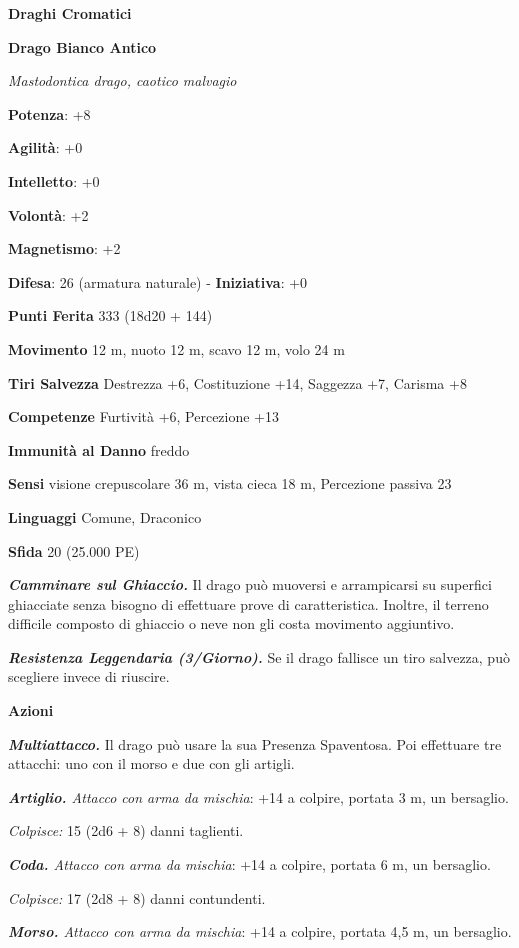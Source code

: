 \begin{multicols}{2}
\textbf{Draghi Cromatici}

\textbf{Drago Bianco Antico}

\emph{Mastodontica drago, caotico malvagio}

\textbf{Potenza}: +8

\textbf{Agilità}: +0

\textbf{Intelletto}: +0

\textbf{Volontà}: +2

\textbf{Magnetismo}: +2

\textbf{Difesa}: 26 (armatura naturale) - \textbf{Iniziativa}: +0

\textbf{Punti Ferita} 333 (18d20 + 144)

\textbf{Movimento} 12 m, nuoto 12 m, scavo 12 m, volo 24 m

\textbf{Tiri Salvezza} Destrezza +6, Costituzione +14, Saggezza +7,
Carisma +8

\textbf{Competenze} Furtività +6, Percezione +13

\textbf{Immunità al Danno} freddo

\textbf{Sensi} visione crepuscolare 36 m, vista cieca 18 m, Percezione passiva
23

\textbf{Linguaggi} Comune, Draconico

\textbf{Sfida} 20 (25.000 PE)\smallskip

\emph{\textbf{Camminare sul Ghiaccio.}} Il drago può muoversi e
arrampicarsi su superfici ghiacciate senza bisogno di effettuare prove
di caratteristica. Inoltre, il terreno difficile composto di ghiaccio o
neve non gli costa movimento aggiuntivo.

\emph{\textbf{Resistenza Leggendaria (3/Giorno).}} Se il drago fallisce
un tiro salvezza, può scegliere invece di riuscire.

\smallskip\textbf{Azioni}

\emph{\textbf{Multiattacco.}} Il drago può usare la sua Presenza
Spaventosa. Poi effettuare tre attacchi: uno con il morso e due con gli
artigli.

\emph{\textbf{Artiglio.} Attacco con arma da mischia}: +14 a colpire,
portata 3 m, un bersaglio.

\emph{Colpisce:} 15 (2d6 + 8) danni taglienti.

\emph{\textbf{Coda.} Attacco con arma da mischia}: +14 a colpire,
portata 6 m, un bersaglio.

\emph{Colpisce:} 17 (2d8 + 8) danni contundenti.

\emph{\textbf{Morso.} Attacco con arma da mischia}: +14 a colpire,
portata 4,5 m, un bersaglio.


\end{multicols}
